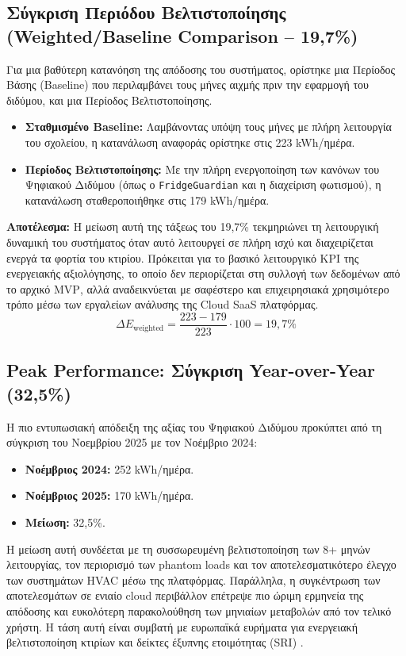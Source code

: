 \subsection{Σύγκριση Περιόδου Βελτιστοποίησης (Weighted/Baseline Comparison -- 19,7\%)}
Για μια βαθύτερη κατανόηση της απόδοσης του συστήματος, ορίστηκε μια Περίοδος Βάσης (\textlatin{Baseline}) που περιλαμβάνει τους μήνες αιχμής πριν την εφαρμογή του διδύμου, και μια Περίοδος Βελτιστοποίησης.
\begin{itemize}
\item \textbf{Σταθμισμένο Baseline:} Λαμβάνοντας υπόψη τους μήνες με πλήρη λειτουργία του σχολείου, η κατανάλωση αναφοράς ορίστηκε στις 223 \textlatin{kWh}/ημέρα.
\item \textbf{Περίοδος Βελτιστοποίησης:} Με την πλήρη ενεργοποίηση των κανόνων του Ψηφιακού Διδύμου (όπως ο \texttt{FridgeGuardian} και η διαχείριση φωτισμού), η κατανάλωση σταθεροποιήθηκε στις 179 \textlatin{kWh}/ημέρα.
\end{itemize}
\textbf{Αποτέλεσμα:} Η μείωση αυτή της τάξεως του 19,7\% τεκμηριώνει τη λειτουργική δυναμική του συστήματος όταν αυτό λειτουργεί σε πλήρη ισχύ και διαχειρίζεται ενεργά τα φορτία του κτιρίου. Πρόκειται για το βασικό λειτουργικό \textlatin{KPI} της ενεργειακής αξιολόγησης, το οποίο δεν περιορίζεται στη συλλογή των δεδομένων από το αρχικό \textlatin{MVP}, αλλά αναδεικνύεται με σαφέστερο και επιχειρησιακά χρησιμότερο τρόπο μέσω των εργαλείων ανάλυσης της \textlatin{Cloud SaaS} πλατφόρμας.
\begin{equation}
\Delta E_{\text{weighted}} = \frac{223-179}{223}\cdot 100 = 19{,}7\%
\end{equation}

\subsection{Peak Performance: Σύγκριση Year-over-Year (32,5\%)}
Η πιο εντυπωσιακή απόδειξη της αξίας του Ψηφιακού Διδύμου προκύπτει από τη σύγκριση του Νοεμβρίου 2025 με τον Νοέμβριο 2024:
\begin{itemize}
\item \textbf{Νοέμβριος 2024:} 252 \textlatin{kWh}/ημέρα.
\item \textbf{Νοέμβριος 2025:} 170 \textlatin{kWh}/ημέρα.
\item \textbf{Μείωση:} 32,5\%.
\end{itemize}
Η μείωση αυτή συνδέεται με τη συσσωρευμένη βελτιστοποίηση των 8+ μηνών λειτουργίας, τον περιορισμό των \textlatin{phantom loads} και τον αποτελεσματικότερο έλεγχο των συστημάτων \textlatin{HVAC} μέσω της πλατφόρμας. Παράλληλα, η συγκέντρωση των αποτελεσμάτων σε ενιαίο cloud περιβάλλον επέτρεψε πιο ώριμη ερμηνεία της απόδοσης και ευκολότερη παρακολούθηση των μηνιαίων μεταβολών από τον τελικό χρήστη.
Η τάση αυτή είναι συμβατή με ευρωπαϊκά ευρήματα για ενεργειακή βελτιστοποίηση κτιρίων και δείκτες έξυπνης ετοιμότητας (\textlatin{SRI}) \cite{Apostolopoulos2022, Markoska2019, EPBD2024, Fokaides2020, Zamanidou2024}.

